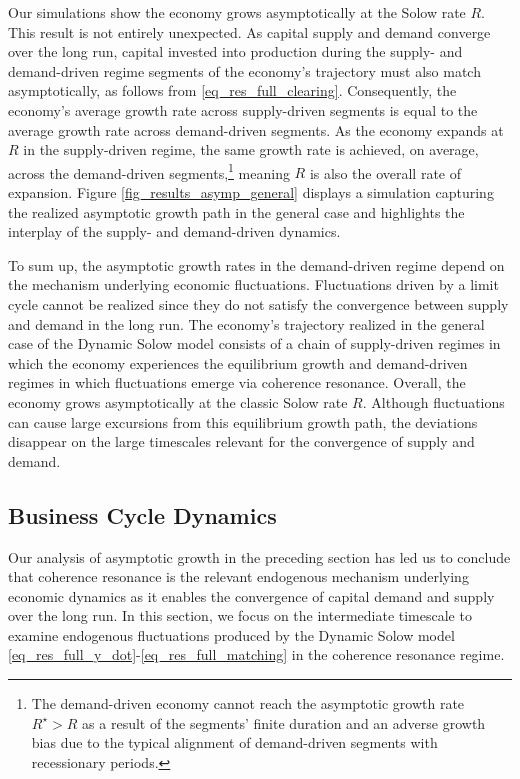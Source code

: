 \documentclass[authoryear, review]{elsarticle}
\begin{document}
Our simulations show the economy grows asymptotically at the Solow rate $R$. This result is not entirely unexpected. As capital supply and demand converge over the long run, capital invested into production during the supply- and demand-driven regime segments of the economy's trajectory must also match asymptotically, as follows from \eqref{eq_res_full_clearing}. Consequently, the economy's average growth rate across supply-driven segments is equal to the average growth rate across demand-driven segments. As the economy expands at $R$ in the supply-driven regime, the same growth rate is achieved, on average, across the demand-driven segments,\footnote{The demand-driven economy cannot reach the asymptotic growth rate $R^\star>R$ as a result of the segments' finite duration and an adverse growth bias due to the typical alignment of demand-driven segments with recessionary periods.} meaning $R$ is also the overall rate of expansion. Figure \ref{fig_results_asymp_general} displays a simulation capturing the realized asymptotic growth path in the general case and highlights the interplay of the supply- and demand-driven dynamics. 

To sum up, the asymptotic growth rates in the demand-driven regime depend on the mechanism underlying economic fluctuations. Fluctuations driven by a limit cycle cannot be realized since they do not satisfy the convergence between supply and demand in the long run. The economy's trajectory realized in the general case of the Dynamic Solow model consists of a chain of supply-driven regimes in which the economy experiences the equilibrium growth and demand-driven regimes in which fluctuations emerge via coherence resonance. Overall, the economy grows asymptotically at the classic Solow rate $R$. Although fluctuations can cause large excursions from this equilibrium growth path, the deviations disappear on the large timescales relevant for the convergence of supply and demand.  

\subsection{Business Cycle Dynamics}\label{sec_results_cycle}

Our analysis of asymptotic growth in the preceding section has led us to conclude that coherence resonance is the relevant endogenous mechanism underlying economic dynamics as it enables the convergence of capital demand and supply over the long run. In this section, we focus on the intermediate timescale to examine endogenous fluctuations produced by the Dynamic Solow model \eqref{eq_res_full_y_dot}-\eqref{eq_res_full_matching} in the coherence resonance regime. 
\end{document}
